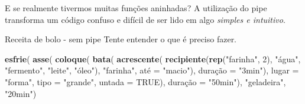 \documentclass[
  10pt,
  ignorenonframetext,
]{beamer}
\newenvironment{Shaded}{\begin{snugshade}}{\end{snugshade}}
\newcommand{\DataTypeTok}[1]{\textcolor[rgb]{0.13,0.29,0.53}{#1}}
\newcommand{\DecValTok}[1]{\textcolor[rgb]{0.00,0.00,0.81}{#1}}
\newcommand{\KeywordTok}[1]{\textcolor[rgb]{0.13,0.29,0.53}{\textbf{#1}}}
\newcommand{\NormalTok}[1]{#1}
\newcommand{\OtherTok}[1]{\textcolor[rgb]{0.56,0.35,0.01}{#1}}
\newcommand{\StringTok}[1]{\textcolor[rgb]{0.31,0.60,0.02}{#1}}
\begin{document}
\begin{frame}{E se realmente tivermos muitas funções aninhadas?}
\protect\hypertarget{e-se-realmente-tivermos-muitas-funuxe7uxf5es-aninhadas}{}
A utilização do pipe transforma um código confuso e difícil de ser lido
em algo \emph{simples e intuitivo}.
\end{frame}

\begin{frame}[fragile]{Receita de bolo - sem pipe}
\protect\hypertarget{receita-de-bolo---sem-pipe}{}
Tente entender o que é preciso fazer.

\begin{Shaded}
\begin{Highlighting}[]
\KeywordTok{esfrie}\NormalTok{(}
  \KeywordTok{asse}\NormalTok{(}
    \KeywordTok{coloque}\NormalTok{(}
      \KeywordTok{bata}\NormalTok{(}
        \KeywordTok{acrescente}\NormalTok{(}
          \KeywordTok{recipiente}\NormalTok{(}\KeywordTok{rep}\NormalTok{(}\StringTok{"farinha"}\NormalTok{, }\DecValTok{2}\NormalTok{), }\StringTok{"água"}\NormalTok{, }
                     \StringTok{"fermento"}\NormalTok{, }\StringTok{"leite"}\NormalTok{, }\StringTok{"óleo"}\NormalTok{), }
          \StringTok{"farinha"}\NormalTok{, até =}\StringTok{ "macio"}\NormalTok{), }
\NormalTok{        duração =}\StringTok{ "3min"}\NormalTok{), }
      \DataTypeTok{lugar =} \StringTok{"forma"}\NormalTok{, }\DataTypeTok{tipo =} \StringTok{"grande"}\NormalTok{, }
      \DataTypeTok{untada =} \OtherTok{TRUE}\NormalTok{), duração =}\StringTok{ "50min"}\NormalTok{), }
  \StringTok{"geladeira"}\NormalTok{, }\StringTok{"20min"}\NormalTok{)}
\end{Highlighting}
\end{Shaded}
\end{frame}
\end{document}
